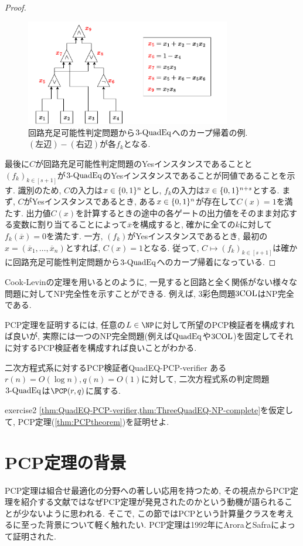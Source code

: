\begin{proof}
  \begin{figure}[ht]
    \centering
    \includegraphics[width=0.8\textwidth]{images/circuit_to_3-QUADEQ.pdf}
    \caption{回路充足可能性判定問題から$\text{3-QuadEq}$へのカープ帰着の例. $(\text{左辺})-(\text{右辺})$が各$f_k$となる. \label{fig:circuit-to-3-QUADEQ}}
  \end{figure}

  最後に$C$が回路充足可能性判定問題のYesインスタンスであることと$(f_k)_{k\in[s+1]}$が$\text{3-QuadEq}$のYesインスタンスであることが同値であることを示す.
  識別のため, $C$の入力は$x\in\{0,1\}^n$とし, $f_k$の入力は$\overline{x} \in \{0,1\}^{n+s}$とする.
  まず, $C$がYesインスタンスであるとき, ある$x\in\{0,1\}^n$が存在して$C(x)=1$を満たす.
  出力値$C(x)$を計算するときの途中の各ゲートの出力値をそのまま対応する変数に割り当てることによって$\overline{x}$を構成すると, 確かに全ての$k$に対して$f_k(\overline{x})=0$を満たす.
  一方, $(f_k)$がYesインスタンスであるとき, 最初の$x=(\overline{x}_1,\dots,\overline{x}_{n})$とすれば, $C(x)=1$となる.
  従って, $C\mapsto (f_k)_{k\in[s+1]}$は確かに回路充足可能性判定問題から$\text{3-QuadEq}$へのカープ帰着になっている.
\end{proof}

Cook-Levinの定理を用いると\cite{Karp1972}のように, 一見すると回路と全く関係がない様々な問題に対してNP完全性を示すことができる.
例えば, 3彩色問題$\text{3COL}$はNP完全である.

PCP定理を証明するには, 任意の$L\in\NP$に対して所望のPCP検証者を構成すれば良いが,
実際には一つのNP完全問題(例えば$\text{QuadEq}$や$\text{3COL}$)を固定してそれに対するPCP検証者を構成すれば良いことがわかる.

\begin{theorem}{二次方程式系に対するPCP検証者}{QuadEQ-PCP-verifier}
  ある$r(n)=O(\log n),q(n)=O(1)$に対して, 二次方程式系の判定問題$\text{3-QuadEq}$は$\PCP(r,q)$に属する.
\end{theorem}

\begin{exercise}{}{exercise2}
  \cref{thm:QuadEQ-PCP-verifier,thm:ThreeQuadEQ-NP-complete}を仮定して, PCP定理(\cref{thm:PCPtheorem})を証明せよ.
\end{exercise}

\section{PCP定理の背景}
PCP定理は組合せ最適化の分野への著しい応用を持つため,
その視点からPCP定理を紹介する文献ではなぜPCP定理が発見されたのかという動機が語られることが少ないように思われる.
そこで, この節ではPCPという計算量クラスを考えるに至った背景について軽く触れたい.
PCP定理は1992年にAroraとSafraによって証明された.




